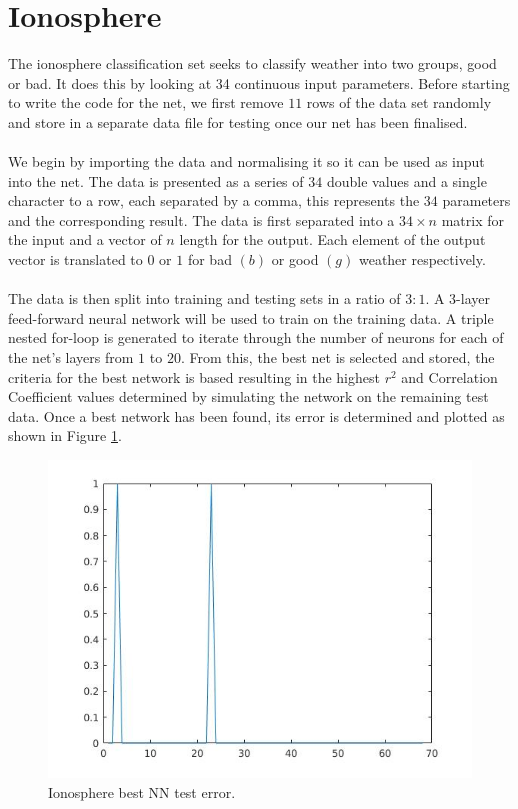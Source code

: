 \documentclass{article}%
\begin{document}
\section{Ionosphere}
The ionosphere classification set seeks to classify weather into two groups, good or bad. It does this by looking at 34 continuous input parameters. Before starting to write the code for the net, we first remove $11$ rows of the data set randomly and store in a separate data file for testing once our net has been finalised.
\\
\\
We begin by importing the data and normalising it so it can be used as input into the net. The data is presented as a series of $34$ double values and a single character to a row, each separated by a comma, this represents the $34$ parameters and the corresponding result. The data is first separated into a $34 \times n$ matrix for the input and a vector of $n$ length for the output. Each element of the output vector is translated to $0$ or $1$ for bad $(b)$ or good $(g)$ weather respectively.
\\
\\
The data is then split into training and testing sets in a ratio of $3:1$. A 3-layer feed-forward neural network will be used to train on the training data. A triple nested for-loop is generated to iterate through the number of neurons for each of the net's layers from $1$ to $20$. From this, the best net is selected and stored, the criteria for the best network is based resulting in the highest $r^2$ and Correlation Coefficient values determined by simulating the network on the remaining test data. Once a best network has been found, its error is determined and plotted as shown in Figure \ref{fig:iontrain}.
\begin{figure}[H]
\centering
\includegraphics[scale=0.5]{Images/iontrain.jpg}
\caption{Ionosphere best NN test error.}
\label{fig:iontrain}
\end{figure}
\end{document}
